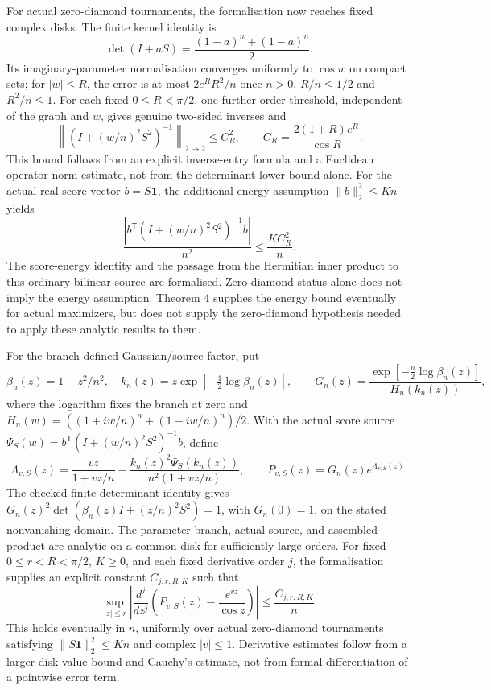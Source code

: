 \documentclass[11pt]{article}
\begin{document}
For actual zero-diamond tournaments, the formalisation now reaches fixed complex disks. The finite kernel identity is
\[
\det(I+aS)=\frac{(1+a)^n+(1-a)^n}{2}.
\]
Its imaginary-parameter normalisation converges uniformly to $\cos w$ on compact sets; for $|w|\le R$, the error is at most $2e^R R^2/n$ once $n>0$, $R/n\le1/2$ and $R^2/n\le1$. For each fixed $0\le R<\pi/2$, one further order threshold, independent of the graph and $w$, gives genuine two-sided inverses and
\[
\left\|(I+(w/n)^2S^2)^{-1}\right\|_{2\to2}\le C_R^2,
\qquad C_R=\frac{2(1+R)e^R}{\cos R}.
\]
This bound follows from an explicit inverse-entry formula and a Euclidean operator-norm estimate, not from the determinant lower bound alone. For the actual real score vector $b=S\mathbf1$, the additional energy assumption $\lVert b\rVert_2^2\le Kn$ yields
\[
\frac{\left|b^{\mathsf T}(I+(w/n)^2S^2)^{-1}b\right|}{n^2}
\le\frac{KC_R^2}{n}.
\]
The score-energy identity and the passage from the Hermitian inner product to this ordinary bilinear source are formalised. Zero-diamond status alone does not imply the energy assumption. Theorem 4 supplies the energy bound eventually for actual maximizers, but does not supply the zero-diamond hypothesis needed to apply these analytic results to them. 

For the branch-defined Gaussian/source factor, put
\[
 \beta_n(z)=1-z^2/n^2,\quad k_n(z)=z\exp[-\tfrac12\log\beta_n(z)],\qquad
 G_n(z)=\frac{\exp[-\tfrac n2\log\beta_n(z)]}{H_n(k_n(z))},
\]
where the logarithm fixes the branch at zero and
$H_n(w)=((1+iw/n)^n+(1-iw/n)^n)/2$. With the actual score source
$\Psi_S(w)=b^{\mathsf T}(I+(w/n)^2S^2)^{-1}b$, define
\[
 \Lambda_{v,S}(z)=\frac{vz}{1+vz/n}
 -\frac{k_n(z)^2\Psi_S(k_n(z))}{n^2(1+vz/n)},\qquad
 P_{v,S}(z)=G_n(z)e^{\Lambda_{v,S}(z)}.
\]
The checked finite determinant identity gives
$G_n(z)^2\det(\beta_n(z)I+(z/n)^2S^2)=1$, with $G_n(0)=1$, on the stated nonvanishing domain. The parameter branch, actual source, and assembled product are analytic on a common disk for sufficiently large orders. For fixed $0\le r<R<\pi/2$, $K\ge0$, and each fixed derivative order $j$, the formalisation supplies an explicit constant $C_{j,r,R,K}$ such that
\[
 \sup_{|z|\le r}\left|\frac{d^j}{dz^j}
 \left(P_{v,S}(z)-\frac{e^{vz}}{\cos z}\right)\right|
 \le \frac{C_{j,r,R,K}}n.
\]
This holds eventually in $n$, uniformly over actual zero-diamond tournaments satisfying $\|S\mathbf1\|_2^2\le Kn$ and complex $|v|\le1$. Derivative estimates follow from a larger-disk value bound and Cauchy's estimate, not from formal differentiation of a pointwise error term. 
\end{document}
